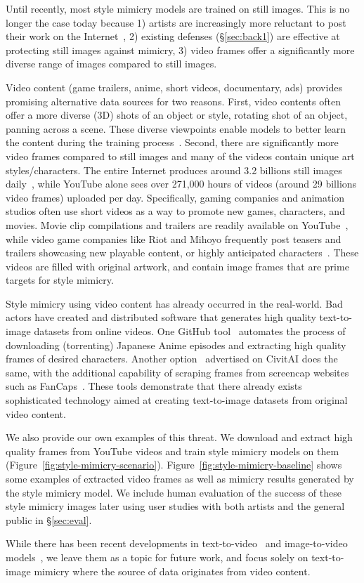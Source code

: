 Until recently, most style mimicry models are trained on still images. This 
is no longer the case today because 1) artists are increasingly more reluctant to post their 
work on the Internet~\cite{aiprotest}, 2) existing defenses (\S\ref{sec:back1}) are effective at protecting still images against mimicry, 3) video frames offer a significantly more diverse range of images compared to still images. 

Video content (\eg game trailers, anime, short videos, documentary, ads) provides promising alternative data sources for two reasons. First, video contents often offer a more diverse (3D) shots of an object or style, \eg rotating shot of an object, panning across a scene. These diverse viewpoints 
enable models to better learn the content during the training process~\cite{videomotivate}. Second, there are significantly more video frames compared to still images and many of the videos contain unique art styles/characters. The entire Internet produces around 3.2 billions still images daily~\cite{manyvideos}, while YouTube alone sees over 271,000 hours of videos (\ie around 29 billions video frames) uploaded per day. Specifically, gaming companies and animation studios often use short videos as a way to promote new games, characters, and movies. Movie clip compilations and trailers are readily available on YouTube~\cite{movietrailers}, while video game companies like Riot and Mihoyo frequently post teasers and trailers showcasing new playable content, or highly anticipated characters~\cite{genshintrailer, leaguetrailer}. These videos are filled with original artwork, and contain image frames that are prime targets for style mimicry. 

Style mimicry using video content has already occurred in the real-world. Bad actors have created and distributed software that generates high quality text-to-image datasets from online videos. One GitHub tool~\cite{anime2sd} automates the process of downloading (\eg torrenting) Japanese Anime episodes and extracting high quality frames of desired characters. Another option~\cite{civitai-video} advertised on CivitAI does the same, with the additional capability of scraping frames from screencap websites such as FanCaps~\cite{fancaps}. These tools demonstrate that there already exists sophisticated technology aimed at creating text-to-image datasets from original video content. 

We also provide our own examples of this threat. We download and extract high quality frames from YouTube videos and train style mimicry models on them (Figure~\ref{fig:style-mimicry-scenario}). Figure~\ref{fig:style-mimicry-baseline} shows some examples of extracted video frames as well as mimicry results generated by the style mimicry model. We include human evaluation of the success of these style mimicry images later using user studies with both artists and the general public in \S\ref{sec:eval}. 

While there has been recent developments in text-to-video~\cite{videoworldsimulators2024} and image-to-video models~\cite{blattmann2023stable}, we leave them as a topic for future work, and focus solely on text-to-image mimicry where the source of data originates from video content. 

